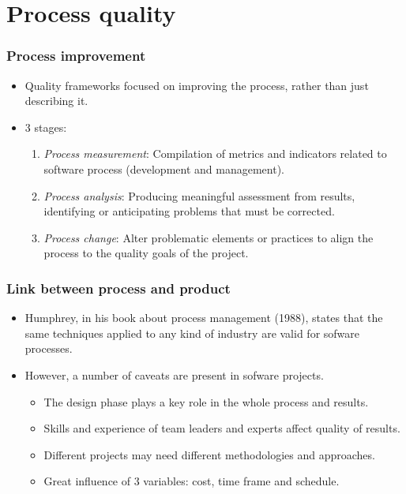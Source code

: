 \documentclass{beamer}
\begin{document}

\section{Process quality}


\begin{frame}
 \frametitle{Process improvement}
 \begin{itemize}
  \item Quality frameworks focused on improving the process, rather 
than just describing it.
  \item 3 stages:
  \begin{enumerate}
   \item \textit{Process measurement}: Compilation of metrics and indicators
related to software process (development and management).
   \item \textit{Process analysis}: Producing meaningful assessment from results,
identifying or anticipating problems that must be corrected.
   \item \textit{Process change}: Alter problematic elements or practices to align
the process to the quality goals of the project.
  \end{enumerate}
  \end{itemize}

\end{frame}


\begin{frame}
 \frametitle{Link between process and product}
 \begin{itemize}
  \item Humphrey, in his book about process management (1988), states that
the same techniques applied to any kind of industry are valid for sofware
processes.
  \item However, a number of caveats are present in sofware projects.
  \begin{itemize}
   \item The design phase plays a key role in the whole process and results.
   \item Skills and experience of team leaders and experts affect quality of results.
   \item Different projects may need different methodologies and approaches.
   \item Great influence of 3 variables: cost, time frame and schedule.
  \end{itemize}

  \end{itemize}

\end{frame}
\end{document}
